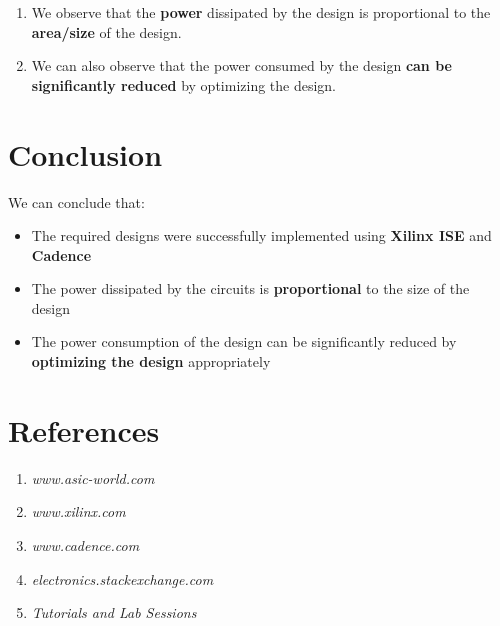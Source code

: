 \documentclass[a4paper,11pt]{report}
\begin{document}
\begin{enumerate}
\item We observe that the \textbf{power} dissipated by the design is proportional to the \textbf{area/size} of the design. 
\item We can also observe that the power consumed by the design \textbf{can be significantly reduced} by optimizing the design.

\end{enumerate}

\section{Conclusion}

We can conclude that:
\begin{itemize}
\item The required designs were successfully implemented using \textbf{Xilinx ISE} and \textbf{Cadence}
\item The power dissipated by the circuits is \textbf{proportional} to the size of the design
\item The power consumption of the design can be significantly reduced by \textbf{optimizing the design} appropriately
\end{itemize}

\section{References}
\begin{enumerate}
\item \textit{www.asic-world.com}
\item \textit{www.xilinx.com}
\item \textit{www.cadence.com}
\item \textit{electronics.stackexchange.com}
\item \textit{Tutorials and Lab Sessions}
\end{enumerate}
\end{document}
